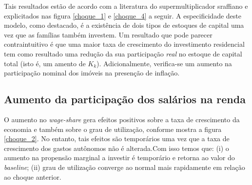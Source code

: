 

Tais resultados estão de acordo com a literatura do supermultiplicador sraffiano e explicitados nas figura \ref{choque_1} e \ref{choque_4} a seguir. A especificidade deste modelo, como destacado, é a existência de dois tipos de estoques de capital uma vez que as famílias também investem. Um resultado que pode parecer contraintuitivo é que uma maior taxa de crescimento do investimento residencial tem como resultado uma redução  da sua participação \textit{real} no estoque de capital total (isto é, um amento de $K_k$). Adicionalmente, verifica-se um aumento  na participação nominal dos imóveis na presenção de inflação.

\subsection*{Aumento da participação dos salários na renda}

O aumento no \textit{wage-share} gera efeitos positivos sobre a taxa de crescimento da economia e também sobre o grau de utilização, conforme mostra a figura \ref{choque_2}. No entanto, tais efeitos são temporários uma vez que a taxa de crescimento dos gastos autônomos não é alterada.Com isso temos que: (i) o aumento na propensão marginal a investir é temporário e retorna ao valor do \textit{baseline}; (ii) grau de utilização converge ao normal mais rapidamente em relação ao choque anterior. 


